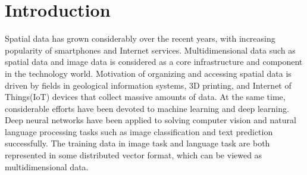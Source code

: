 \chapter{Introduction}
Spatial data has grown considerably over the recent years, with increasing popularity of smartphones and Internet services. Multidimensional data such as spatial data and image data is considered as a core infrastructure and component in the technology world. Motivation of organizing and accessing spatial data is driven by fields in geological information systems, 3D printing, and Internet of Things(IoT) devices that collect massive amounts of data. At the same time, considerable efforts have been devoted to machine learning and deep learning. Deep neural networks have been applied to solving computer vision and natural language processing tasks such as image classification\cite{he2016deep} and text prediction\cite{graves2013speech} successfully. The training data in image task and language task are both represented in some distributed vector format, which can be viewed as multidimensional data. 

